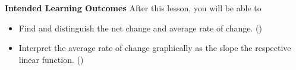 \documentclass[10pt]{article}
\begin{document}
\pagestyle{otherpages}
\thispagestyle{firstpage}




\textbf{Intended Learning Outcomes}
After this lesson, you will be able to 

\begin{itemize}
    \item Find and distinguish the net change and average rate of change. ()
    \item Interpret the average rate of change graphically as the slope the respective linear function. ()
\end{itemize}

\vspace{-0.5cm}

\hrulefill

\vspace{0.5cm}
\end{document}
